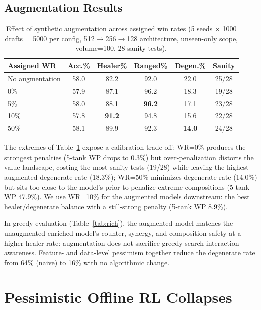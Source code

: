 \documentclass[journal]{IEEEtran}
\begin{document}
\subsection{Augmentation Results}

\begin{table}[t]
\centering
\caption{Effect of synthetic augmentation across assigned win rates (5 seeds $\times$ 1000 drafts = 5000 per config, 512$\to$256$\to$128 architecture, unseen-only scope, volume=100, 28 sanity tests).}
\label{tab:synth}
\setlength{\tabcolsep}{4.5pt}
\begin{tabular}{lccccc}
\toprule
Assigned WR & Acc.\% & Healer\% & Ranged\% & Degen.\% & Sanity \\
\midrule
No augmentation & 58.0 & 82.2 & 92.0 & 22.0 & 25/28 \\
\midrule
0\% & 57.9 & 87.1 & 96.2 & 18.3 & 19/28 \\
5\% & 58.0 & 88.1 & \textbf{96.2} & 17.1 & 23/28 \\
10\% & 57.8 & \textbf{91.2} & 94.8 & 15.6 & 22/28 \\
50\% & 58.1 & 89.9 & 92.3 & \textbf{14.0} & 24/28 \\
\bottomrule
\end{tabular}
\end{table}

The extremes of Table~\ref{tab:synth} expose a calibration trade-off: WR=0\% produces the strongest penalties (5-tank WP drops to 0.3\%) but over-penalization distorts the value landscape, costing the most sanity tests (19/28) while leaving the highest augmented degenerate rate (18.3\%); WR=50\% minimizes degenerate rate (14.0\%) but sits too close to the model's prior to penalize extreme compositions (5-tank WP 47.9\%). We use WR=10\% for the augmented models downstream: the best healer/degenerate balance with a still-strong penalty (5-tank WP 8.9\%).

In greedy evaluation (Table~\ref{tab:rich}), the augmented model matches the unaugmented enriched model's counter, synergy, and composition safety at a higher healer rate: augmentation does not sacrifice greedy-search interaction-awareness. Feature- and data-level pessimism together reduce the degenerate rate from 64\% (naive) to 16\% with no algorithmic change.

\section{Pessimistic Offline RL Collapses}
\label{sec:cql}
\end{document}
